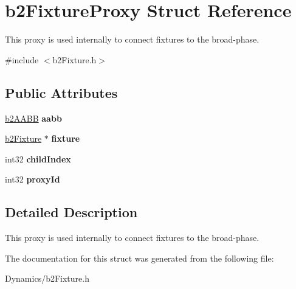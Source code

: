 \hypertarget{structb2FixtureProxy}{}\section{b2\+Fixture\+Proxy Struct Reference}
\label{structb2FixtureProxy}


This proxy is used internally to connect fixtures to the broad-\/phase.  




{\ttfamily \#include $<$b2\+Fixture.\+h$>$}

\subsection*{Public Attributes}
\begin{DoxyCompactItemize}
\item 
\mbox{\label{structb2FixtureProxy_ad8950f61ce28cfa5b676065d4d843da7}} 
\mbox{\hyperlink{structb2AABB}{b2\+A\+A\+BB}} {\bfseries aabb}
\item 
\mbox{\label{structb2FixtureProxy_a3a0842dc9699c25658548c2005d0ef62}} 
\mbox{\hyperlink{classb2Fixture}{b2\+Fixture}} $\ast$ {\bfseries fixture}
\item 
\mbox{\label{structb2FixtureProxy_a2edb15552cf71f48dacc3608bb134166}} 
int32 {\bfseries child\+Index}
\item 
\mbox{\label{structb2FixtureProxy_aa0ca7e71341368fe6c6913fb39c7283b}} 
int32 {\bfseries proxy\+Id}
\end{DoxyCompactItemize}


\subsection{Detailed Description}
This proxy is used internally to connect fixtures to the broad-\/phase. 

The documentation for this struct was generated from the following file\+:\begin{DoxyCompactItemize}
\item 
Dynamics/b2\+Fixture.\+h\end{DoxyCompactItemize}
